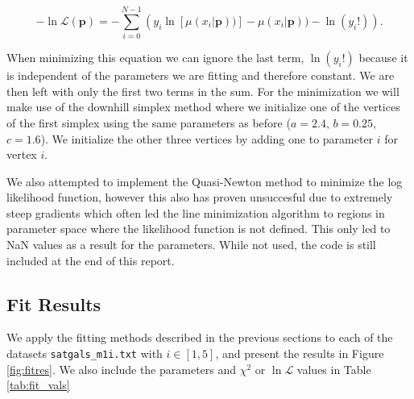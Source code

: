 \begin{equation}
    -\ln \mathcal{L}(\boldsymbol{p}) = -\sum_{i=0}^{N-1} \left(y_i\ln\left[\mu(x_i | \boldsymbol{p}))\right] - \mu(x_i | \boldsymbol{p})) - \ln(y_i!)\right).\label{eq:logL}
\end{equation}

When minimizing this equation we can ignore the last term, $\ln(y_i!)$ because it is independent of the parameters we are fitting and therefore constant. We are then left with only the first two terms in the sum. For the minimization we will make use of the downhill simplex method where we initialize one of the vertices of the first simplex using the same parameters as before ($a=2.4$, $b=0.25$, $c=1.6$). We initialize the other three vertices by adding one to parameter $i$ for vertex $i$.

We also attempted to implement the Quasi-Newton method to minimize the log likelihood function, however this also has proven unsuccesful due to extremely steep gradients which often led the line minimization algorithm to regions in parameter space where the likelihood function is not defined. This only led to NaN values as a result for the parameters. While not used, the code is still included at the end of this report.




\subsection{Fit Results}\label{sec:fitresults}

We apply the fitting methods described in the previous sections to each of the datasets \texttt{satgals\_m1i.txt} with $i \in [1,5]$, and present the results in Figure \ref{fig:fitres}. We also include the parameters and $\chi^2$ or $\ln\mathcal{L}$ values in Table \ref{tab:fit_vals}

